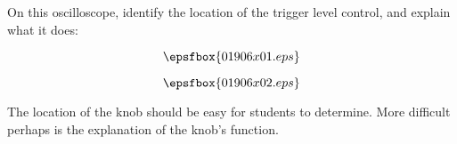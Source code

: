 

On this oscilloscope, identify the location of the trigger level control, and explain what it does:

$$\epsfbox{01906x01.eps}$$







$$\epsfbox{01906x02.eps}$$







The location of the knob should be easy for students to determine.  More difficult perhaps is the explanation of the knob's function.




